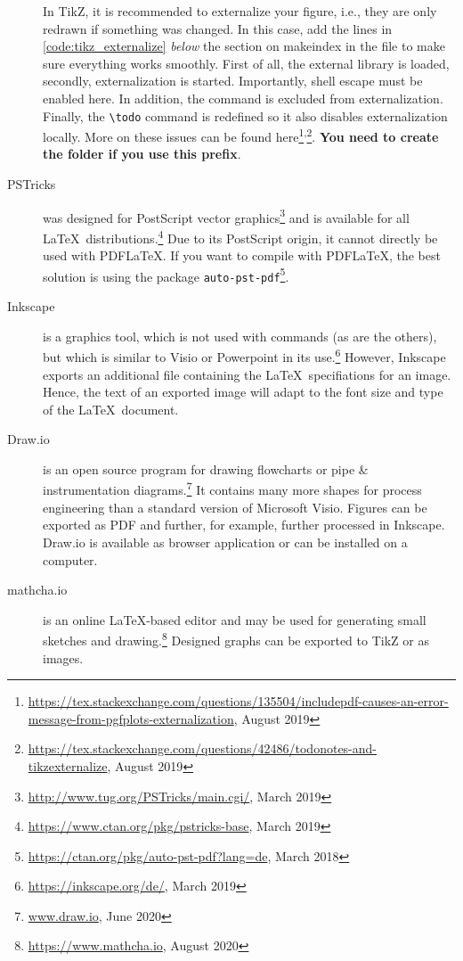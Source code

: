 \begin{description}
In TikZ, it is recommended to externalize your figure, i.e., they are only redrawn if something was changed. In this case, add the lines in \autoref{code:tikz_externalize} \emph{below} the section on makeindex in the  file to make sure everything works smoothly. First of all, the external library is loaded, secondly, externalization is started. Importantly, shell escape must be enabled here. In addition, the \verb++ command is excluded from externalization. Finally, the \verb+\todo+ command is redefined so it also disables externalization locally. More on these issues can be found here\footnote{\url{https://tex.stackexchange.com/questions/135504/includepdf-causes-an-error-message-from-pgfplots-externalization}, August 2019}\textsuperscript{,}\footnote{\url{https://tex.stackexchange.com/questions/42486/todonotes-and-tikzexternalize}, August 2019}. \textbf{You need to create the folder  if you use this prefix}.
	\item[PSTricks] was designed for PostScript vector graphics\footnote{\url{http://www.tug.org/PSTricks/main.cgi/}, March 2019} and is available for all \LaTeX\ distributions.\footnote{\url{https://www.ctan.org/pkg/pstricks-base}, March 2019} Due to its PostScript origin, it cannot directly be used with PDF\LaTeX. If you want to compile with PDF\LaTeX, the best solution is using the package \verb+auto-pst-pdf+\footnote{\url{https://ctan.org/pkg/auto-pst-pdf?lang=de}, March 2018}.
	\item[Inkscape] is a graphics tool, which is not used with commands (as are the others), but which is similar to Visio or Powerpoint in its use.\footnote{\url{https://inkscape.org/de/}, March 2019} However, Inkscape exports an additional file containing the \LaTeX\ specifiations for an image. Hence, the text of an exported image will adapt to the font size and type of the \LaTeX\ document.
	\item[Draw.io] is an open source program for drawing flowcharts or pipe \& instrumentation diagrams.\footnote{\url{www.draw.io}, June 2020} It contains many more shapes for process engineering than a standard version of Microsoft Visio. Figures can be exported as PDF and further, for example, further processed in Inkscape. Draw.io is available as browser application or can be installed on a computer.
	\item[mathcha.io] is an online \LaTeX-based editor and may be used for generating small sketches and drawing.\footnote{\url{https://www.mathcha.io}, August 2020} Designed graphs can be exported to TikZ or as images.
\end{description}
